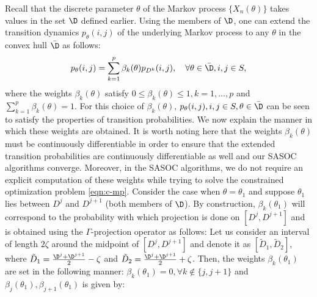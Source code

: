 \documentclass[11pt,letterpaper,english]{article}
\begin{document}
Recall that the discrete parameter $\theta$ of the Markov process $\{X_n(\theta)\}$ takes values in the set $\D$ defined earlier. Using the members of $\D$, one can extend the transition dynamics $p_\theta(i,j)$ of the underlying Markov process to any $\theta$ in the convex hull $\bar\D$ as follows:
\begin{equation}
     p_\theta(i,j) = \sum\limits_{k=1}^{p} \beta_k(\theta) p_{D^k}(i,j), \quad \forall \theta \in \bar\D, i,j \in S,
\label{eq:pthetabar}
\end{equation}
where the weights $\beta_k(\theta)$ satisfy $0 \le \beta_k(\theta) \le 1, k=1,\ldots,p$ and $\sum\limits_{k=1}^{p} \beta_k(\theta) = 1$. For this choice of $\beta_k(\theta)$, $p_\theta(i,j), i,j \in S, \theta \in \bar\D$ can be seen to satisfy the properties of transition probabilities. We now explain the manner in which these weights are obtained.  It is worth noting here that the weights $\beta_k(\theta)$ must be continuously differentiable in order to ensure that the extended transition probabilities are continuously differentiable as well and our SASOC algorithms converge. Moreover, in the SASOC algorithms, we do not require an explicit computation of these weights while trying to solve the constrained optimization problem \eqref{eqn:c-mp}. Consider the case when $\theta = \theta_1$ and suppose $\theta_1$ lies between $D^j$ and $D^{j+1}$ (both members of $\D$). By construction, $\beta_k(\theta_1)$ will correspond to the probability with which projection is done on $[D^j,D^{j+1}]$ and is obtained 
using the $\Gamma$-projection operator as follows:  Let us consider an interval of length $2 \zeta$ around the midpoint of $[D^j, D^{j+1}]$ and denote it as $[\tilde D_1, \tilde D_2]$, where $\tilde D_1 = \frac{\D^j+\D^{j+1}}{2} - \zeta$ and $\tilde D_2 = \frac{\D^j+\D^{j+1}}{2} + \zeta$.
Then, the weights $\beta_k(\theta_1)$ are set in the following manner:
$\beta_k(\theta_1) = 0, \forall k \notin \{j,j+1\}$ and $\beta_j(\theta_1), \beta_{j+1}(\theta_1)$ is given by:
\end{document}
